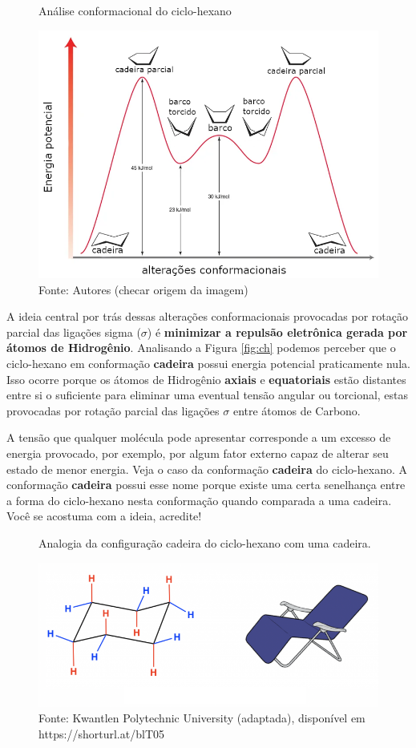 \begin{figure}[h]
\centering
\caption{Análise conformacional do ciclo-hexano}
\vspace{0.25cm}
\label{fig:ch2}
\includegraphics[width=0.85\linewidth]{imagens/analise_conformacional_ch_2.png}
\caption*{Fonte: Autores (checar origem da imagem)}
\end{figure}

A ideia central por trás dessas alterações conformacionais provocadas por rotação parcial das ligações sigma ($\sigma$) é \textbf{minimizar a repulsão eletrônica gerada por átomos de Hidrogênio}. Analisando a Figura \ref{fig:ch} podemos perceber que o ciclo-hexano em conformação \textbf{cadeira} possui energia potencial praticamente nula. Isso ocorre porque os átomos de Hidrogênio \textbf{axiais} e \textbf{equatoriais} estão distantes entre si o suficiente para eliminar uma eventual tensão angular ou torcional, estas provocadas por rotação parcial das ligações $\sigma$ entre átomos de Carbono.

A tensão que qualquer molécula pode apresentar corresponde a um excesso de energia provocado, por exemplo, por algum fator externo capaz de alterar seu estado de menor energia. Veja o caso da conformação \textbf{cadeira} do ciclo-hexano. A conformação \textbf{cadeira} possui esse nome porque existe uma certa senelhança entre a forma do ciclo-hexano nesta conformação quando comparada a uma cadeira. Você se acostuma com a ideia, acredite!

\begin{figure}[h]
\centering
\caption{Analogia da configuração cadeira do ciclo-hexano com uma cadeira.}
\vspace{0.25cm}
\label{fig:cadeira}
\includegraphics[width=0.75\linewidth]{imagens/chair-confirmation-analogue-768x326.png}
\caption*{Fonte: Kwantlen Polytechnic University (adaptada), disponível em https://shorturl.at/blT05}
\end{figure}

